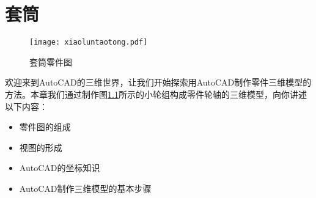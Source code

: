 \chapter{套筒}
\begin{figure}[htbp]
\centering
\texttt{[image: xiaoluntaotong.pdf]}
\caption{套筒零件图}\label{fig:xiaoluntaotong}
\end{figure}
欢迎来到AutoCAD的三维世界，让我们开始探索用AutoCAD制作零件三维模型的方法。本章我们通过制作图\ref{fig:xiaoluntaotong}所示的小轮组构成零件轮轴的三维模型，向你讲述以下内容：
\begin{itemize}
	\item 零件图的组成
	\item 视图的形成
	\item AutoCAD的坐标知识
	\item AutoCAD制作三维模型的基本步骤
\end{itemize}

\endinput